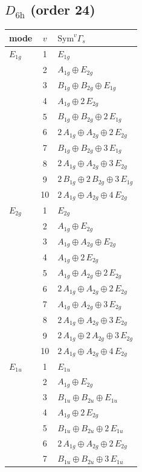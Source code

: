 \documentclass[11pt]{article}
\begin{document}
\subsection*{$D_{6\mathrm{h}}$ \quad (order 24)}
\begin{longtable}{l c p{}}
\hline mode & $v$ & $\mathrm{Sym}^v\Gamma_s$\\ \hline\endhead
$E_{1g}$ & 1 & $E_{1g}$\\
 & 2 & $A_{1g}\oplus E_{2g}$\\
 & 3 & $B_{1g}\oplus B_{2g}\oplus E_{1g}$\\
 & 4 & $A_{1g}\oplus 2\,E_{2g}$\\
 & 5 & $B_{1g}\oplus B_{2g}\oplus 2\,E_{1g}$\\
 & 6 & $2\,A_{1g}\oplus A_{2g}\oplus 2\,E_{2g}$\\
 & 7 & $B_{1g}\oplus B_{2g}\oplus 3\,E_{1g}$\\
 & 8 & $2\,A_{1g}\oplus A_{2g}\oplus 3\,E_{2g}$\\
 & 9 & $2\,B_{1g}\oplus 2\,B_{2g}\oplus 3\,E_{1g}$\\
 & 10 & $2\,A_{1g}\oplus A_{2g}\oplus 4\,E_{2g}$\\
\hline
$E_{2g}$ & 1 & $E_{2g}$\\
 & 2 & $A_{1g}\oplus E_{2g}$\\
 & 3 & $A_{1g}\oplus A_{2g}\oplus E_{2g}$\\
 & 4 & $A_{1g}\oplus 2\,E_{2g}$\\
 & 5 & $A_{1g}\oplus A_{2g}\oplus 2\,E_{2g}$\\
 & 6 & $2\,A_{1g}\oplus A_{2g}\oplus 2\,E_{2g}$\\
 & 7 & $A_{1g}\oplus A_{2g}\oplus 3\,E_{2g}$\\
 & 8 & $2\,A_{1g}\oplus A_{2g}\oplus 3\,E_{2g}$\\
 & 9 & $2\,A_{1g}\oplus 2\,A_{2g}\oplus 3\,E_{2g}$\\
 & 10 & $2\,A_{1g}\oplus A_{2g}\oplus 4\,E_{2g}$\\
\hline
$E_{1u}$ & 1 & $E_{1u}$\\
 & 2 & $A_{1g}\oplus E_{2g}$\\
 & 3 & $B_{1u}\oplus B_{2u}\oplus E_{1u}$\\
 & 4 & $A_{1g}\oplus 2\,E_{2g}$\\
 & 5 & $B_{1u}\oplus B_{2u}\oplus 2\,E_{1u}$\\
 & 6 & $2\,A_{1g}\oplus A_{2g}\oplus 2\,E_{2g}$\\
 & 7 & $B_{1u}\oplus B_{2u}\oplus 3\,E_{1u}$\\

\end{longtable}
\end{document}
